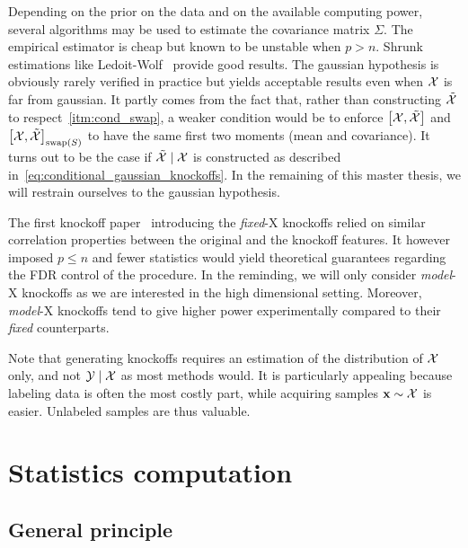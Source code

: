 Depending on the prior on the data and on the available computing power,
several algorithms may be used to estimate the covariance matrix $\Sigma$.
The empirical estimator is cheap but known to be unstable when $p > n$.
Shrunk estimations like Ledoit-Wolf~\cite{ledoit_wolf} provide good results.
\bigbreak
The gaussian hypothesis is obviously rarely verified in practice but yields acceptable results even when
$\mathcal{X}$ is far from gaussian.
It partly comes from the fact that, rather than constructing $\tilde{\mathcal{X}}$ to respect~\ref{itm:cond_swap},
a weaker condition would be to enforce $\big[ \mathcal{X}, \tilde{\mathcal{X}} \big]$ and $\big[ \mathcal{X}, \tilde{\mathcal{X}} \big]_{\operatorname{swap}(S)}$ to have the
same first two moments (mean and covariance).
It turns out to be the case if $\tilde{\mathcal{X}} \mid \mathcal{X}$ is constructed as described in~\ref{eq:conditional_gaussian_knockoffs}.
In the remaining of this master thesis, we will restrain ourselves to the gaussian hypothesis.

The first knockoff paper~\cite{fixed_x_knockoffs} introducing the \textit{fixed}-X knockoffs relied on similar correlation
properties between the original and the knockoff features.
It however imposed $p \leq n$ and fewer statistics would yield theoretical guarantees regarding the FDR control
of the procedure.
In the reminding, we will only consider \textit{model}-X knockoffs as we are interested in the high dimensional
setting.
Moreover, \textit{model}-X knockoffs tend to give higher power experimentally compared to their \textit{fixed}
counterparts.

Note that generating knockoffs requires an estimation of the distribution of $\mathcal{X}$ only,
and not $\mathcal{Y} \mid \mathcal{X}$ as most methods would.
It is particularly appealing because labeling data is often the most costly part,
while acquiring samples $\mathbf{x} \sim \mathcal{X}$ is easier.
Unlabeled samples are thus valuable.

\section{Statistics computation}\label{sec:ksc}

\subsection{General principle}\label{subsec:scg}


